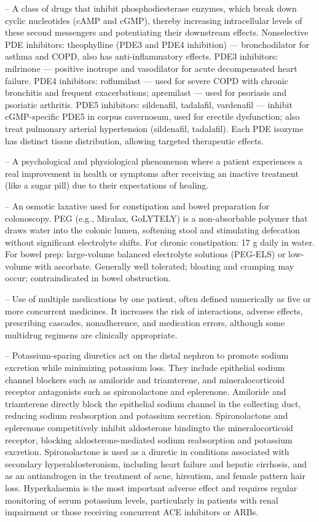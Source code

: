-- A class of drugs that inhibit phosphodiesterase enzymes, which break down cyclic nucleotides (cAMP and cGMP), thereby increasing intracellular levels of these second messengers and potentiating their downstream effects. Nonselective PDE inhibitors: theophylline (PDE3 and PDE4 inhibition) — bronchodilator for asthma and COPD, also has anti-inflammatory effects. PDE3 inhibitors: milrinone — positive inotrope and vasodilator for acute decompensated heart failure. PDE4 inhibitors: roflumilast — used for severe COPD with chronic bronchitis and frequent exacerbations; apremilast — used for psoriasis and psoriatic arthritis. PDE5 inhibitors: sildenafil, tadalafil, vardenafil — inhibit cGMP-specific PDE5 in corpus cavernosum, used for erectile dysfunction; also treat pulmonary arterial hypertension (sildenafil, tadalafil). Each PDE isozyme has distinct tissue distribution, allowing targeted therapeutic effects.

-- A psychological and physiological phenomenon where a patient experiences a real improvement in health or symptoms after receiving an inactive treatment (like a sugar pill) due to their expectations of healing.

-- An osmotic laxative used for constipation and bowel preparation for colonoscopy. PEG (e.g., Miralax, GoLYTELY) is a non-absorbable polymer that draws water into the colonic lumen, softening stool and stimulating defecation without significant electrolyte shifts. For chronic constipation: 17 g daily in water. For bowel prep: large-volume balanced electrolyte solutions (PEG-ELS) or low-volume with ascorbate. Generally well tolerated; bloating and cramping may occur; contraindicated in bowel obstruction.

-- Use of multiple medications by one patient, often defined numerically as five or more concurrent medicines. It increases the risk of interactions, adverse effects, prescribing cascades, nonadherence, and medication errors, although some multidrug regimens are clinically appropriate.

-- Potassium-sparing diuretics act on the distal nephron to promote sodium excretion while minimizing potassium loss. They include epithelial sodium channel blockers such as amiloride and triamterene, and mineralocorticoid receptor antagonists such as spironolactone and eplerenone. Amiloride and triamterene directly block the epithelial sodium channel in the collecting duct, reducing sodium reabsorption and potassium secretion. Spironolactone and eplerenone competitively inhibit aldosterone bindingto the mineralocorticoid receptor, blocking aldosterone-mediated sodium reabsorption and potassium excretion. Spironolactone is used as a diuretic in conditions associated with secondary hyperaldosteronism, including heart failure and hepatic cirrhosis, and as an antiandrogen in the treatment of acne, hirsutism, and female pattern hair loss. Hyperkalaemia is the most important adverse effect and requires regular monitoring of serum potassium levels, particularly in patients with renal impairment or those receiving concurrent ACE inhibitors or ARBs.


